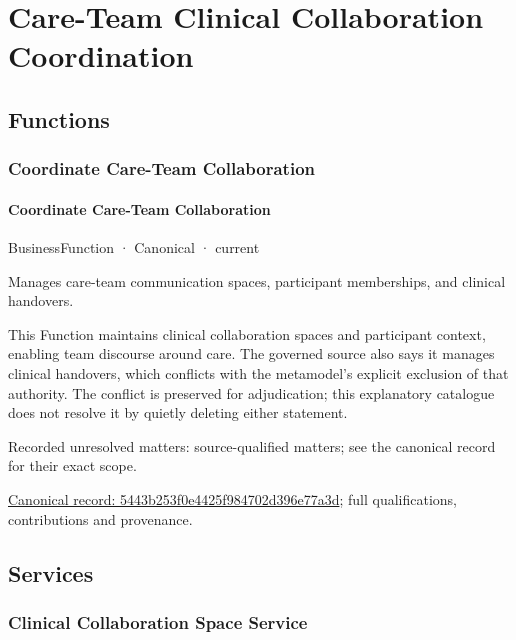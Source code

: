 \section{Care-Team Clinical Collaboration Coordination}

\subsection{Functions}

\subsubsection{Coordinate Care-Team Collaboration}

\paragraph{Coordinate Care-Team Collaboration}

\label{element:5443b253f0e4425f984702d396e77a3d}
{\small BusinessFunction · Canonical · current}\par

Manages care-team communication spaces, participant memberships, and clinical handovers.



This Function maintains clinical collaboration spaces and participant context, enabling team discourse around care. The governed source also says it manages clinical handovers, which conflicts with the metamodel's explicit exclusion of that authority. The conflict is preserved for adjudication; this explanatory catalogue does not resolve it by quietly deleting either statement.


{\small Recorded unresolved matters: source-qualified matters; see the canonical record for their exact scope.}\par
{\footnotesize \href{../../../../continuum/business/business-function/5443b253f0e4425f984702d396e77a3d.md}{Canonical record: 5443b253f0e4425f984702d396e77a3d}; full qualifications, contributions and provenance.}\par
\subsection{Services}

\subsubsection{Clinical Collaboration Space Service}

